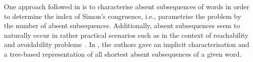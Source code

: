 \documentclass[10pt,a4paper]{amsart}
\def\ta{\mathtt{a}}
\theoremstyle{plain}
\theoremstyle{definition}
\begin{document}
One approach followed in \cite{DBLP:journals/tcs/FleischmannHHHMN23,DBLP:journals/fuin/KoscheKMS22} is to characterise absent subsequences of words in order to determine the index of Simon's congruence, i.e., parametrise the problem by the number of absent subsequences. 
Additionally, absent subsequences seem to naturally occur in rather practical scenarios such as in the context of reachability and avoidability problems~\cite{DBLP:journals/fuin/KoscheKMS22}.
In \cite{DBLP:journals/fuin/KoscheKMS22}, the authors gave an implicit characterisation and a tree-based representation of all shortest absent subsequences of a given word.

\medskip
\end{document}
